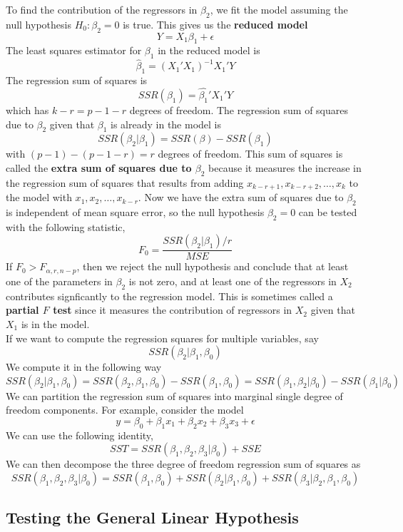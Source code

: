 To find the contribution of the regressors in $\beta_2$, we fit the model assuming the null hypothesis $H_0: \beta_2 = 0$ is true. This gives us the \textbf{reduced model}
\[Y = X_1\beta_1 + \epsilon\]
\noindent
The least squares estimator for $\beta_1$ in the reduced model is 
\[\hat{\beta}_1 = (X_1'X_1)^{-1}X_1'Y\]
The regression sum of squares is 
\[SSR(\beta_1) = \hat{\beta_1}'X_1'Y\]
which has $k-r = p - 1 - r$ degrees of freedom. The regression sum of squares due to $\beta_2$ given that $\beta_1$ is already in the model is 
\[SSR(\beta_2 | \beta_1) = SSR(\beta) - SSR(\beta_1)\]
with $(p-1) - (p - 1 -r) = r$ degrees of freedom. This sum of squares is called the \textbf{extra sum of squares due to $\beta_2$}  because it measures the increase in the regression sum of squares that results from adding $x_{k-r +1}, x_{k-r + 2}, \ldots, x_{k}$ to the model with $x_1,x_2, \ldots, x_{k-r}$. Now we have the extra sum of squares due to $\beta_2$ is independent of mean square error, so the null hypothesis $\beta_2=0$ can be tested with the following statistic,
\[F_0 = \frac{SSR(\beta_2|\beta_1)/r}{MSE}\]
 If $F_0 > F_{\alpha, r, n-p}$, then we reject the null hypothesis and conclude that at least one of the parameters in $\beta_2$ is not zero, and at least one of the regressors in $X_2$ contributes signficantly to the regression model. This is sometimes called a \textbf{partial $F$ test} since it measures the contribution of regressors in $X_2$ given that $X_1$ is in the model.\\

 If we want to compute the regression squares for multiple variables, say 
 \[SSR(\beta_2| \beta_1, \beta_0)\]
 We compute it in the following way 
 \[SSR(\beta_2 | \beta_1, \beta_0) = SSR(\beta_2, \beta_1,\beta_0) - SSR(\beta_1,\beta_0) = SSR(\beta_1, \beta_2| \beta_0) - SSR(\beta_1|\beta_0)\]
 We can partition the regression sum of squares into marginal single degree of freedom components. For example, consider the model
 \[y = \beta_0 + \beta_1x_1 + \beta_2x_2 + \beta_3x_3 + \epsilon\]
 We can use the following identity, 
 \[SST = SSR(\beta_1, \beta_2, \beta_3 | \beta_0) + SSE\]
 We can then decompose the three degree of freedom regression sum of squares as
 \[SSR(\beta_1, \beta_2,\beta_3| \beta_0) = SSR(\beta_1,\beta_0) + SSR(\beta_2 | \beta_1, \beta_0) + SSR(\beta_3| \beta_2, \beta_1,\beta_0)\]
 \subsection{Testing the General Linear Hypothesis}

